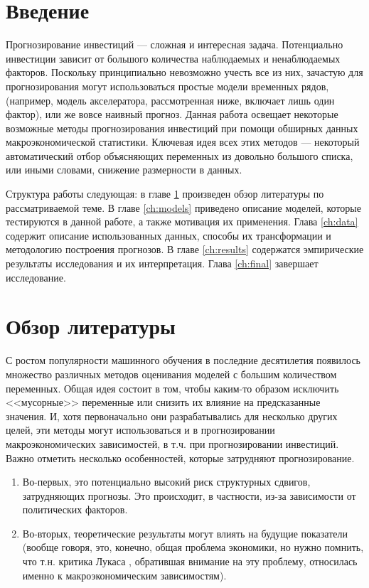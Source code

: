 



\thispagestyle{empty} %


\newpage
 \tableofcontents
 \newpage
 
 \chapter*{Введение} 
 Прогнозирование инвестиций --- сложная и интересная задача. Потенциально инвестиции зависит от большого количества наблюдаемых и ненаблюдаемых факторов. Поскольку принципиально невозможно учесть все из них, зачастую для прогнозирования могут использоваться простые модели временных рядов, (например, модель акселератора, рассмотренная ниже, включает лишь один фактор), или же вовсе наивный прогноз. Данная работа освещает некоторые возможные методы прогнозирования инвестиций при помощи обширных данных макроэкономической статистики. Ключевая идея всех этих методов --- некоторый автоматический отбор объясняющих переменных из довольно большого списка, или иными словами, снижение размерности в данных.

 Структура работы следующая: в главе \ref{ch:lit} произведен обзор литературы по рассматриваемой теме. В главе \ref{ch:models} приведено описание моделей, которые тестируются в данной работе, а также мотивация их применения. Глава \ref{ch:data} содержит  описание использованных данных, способы их трансформации и методологию построения прогнозов. В главе \ref{ch:results} содержатся эмпирические результаты исследования и их интерпретация. Глава \ref{ch:final} завершает исследование.

 \chapter{Обзор литературы} \label{ch:lit}

 С ростом популярности машинного обучения в последние десятилетия появилось множество различных методов оценивания моделей с большим количеством переменных. Общая идея состоит в том, чтобы каким-то образом исключить  <<мусорные>> переменные или снизить их влияние на предсказанные значения. И, хотя первоначально они разрабатывались для несколько других целей, эти методы могут использоваться и в прогнозировании макроэкономических зависимостей, в т.ч. при прогнозировании инвестиций. Важно отметить несколько особенностей, которые затрудняют прогнозирование.
 \begin{enumerate}
     \item Во-первых, это потенциально высокий риск структурных сдвигов, затрудняющих прогнозы. Это происходит, в частности, из-за зависимости от политических факторов.
     \item Во-вторых, теоретические результаты могут влиять на будущие показатели (вообще говоря, это, конечно, общая проблема экономики, но нужно помнить, что т.н. критика Лукаса \cite{lucas1976econometric},
     обратившая внимание на эту проблему, относилась именно к макроэкономическим зависимостям).
 \end{enumerate}

